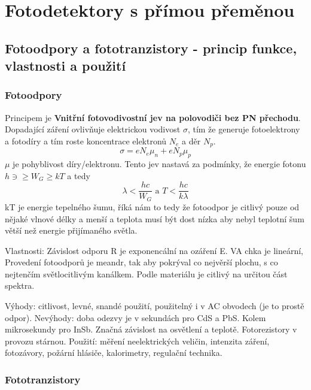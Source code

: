 \documentclass[a4paper, 12pt]{article}
\begin{document}
    \section{Fotodetektory s přímou přeměnou}
        \subsection{Fotoodpory a fototranzistory - princip funkce, vlastnosti a použití}
            \subsubsection{Fotoodpory}
                Principem je \textbf{Vnitřní fotovodivostní jev na polovodiči bez PN přechodu}. Dopadající záření
                ovlivňuje elektrickou vodivost $\sigma$, tím že generuje fotoelektrony a fotodíry a tím roste koncentrace elektronů $N_e$ a děr $N_p$.
                \begin{equation}
                    \sigma = eN_e \mu_n + eN_p \mu_p
                \end{equation}
                $\mu$ je pohyblivost díry/elektronu.
                Tento jev nastavá za podmínky, že energie fotonu $h\ni \geq W_G \geq kT$ a tedy
                \begin{equation}
                    \lambda < \frac{hc}{W_G}\text{ a } T<\frac{hc}{k\lambda}
                \end{equation}
                kT je energie tepelného šumu, říká nám to tedy že fotoodpor je citlivý pouze od nějaké vlnové délky a menší a teplota musí být
                dost nízka aby nebyl teplotní šum větší než energie přijímaného světla.

                Vlastnosti: Závislost odporu R je exponencální na ozáření E. VA chka je lineární, Provedení fotoodporů je meandr, tak aby pokrýval co nejvěrší plochu,
                s co nejtenčím světlocitlivým kanálkem. Podle materiálu je citlivý na určitou část spektra.

                Výhody: citlivost, levné, snandé použití, použitelný i v AC obvodech (je to prostě odpor).
                Nevýhody: doba odezvy je v sekundách pro CdS a PbS. Kolem mikrosekundy pro InSb. Značná závislost na osvětlení a teplotě. Fotorezistory v provozu stárnou.
                Použití: měření neelektrických veličin, intenzita záření, fotozávory, požární hlásiče, kalorimetry, regulační technika.
            \subsubsection{Fototranzistory}
\end{document}
